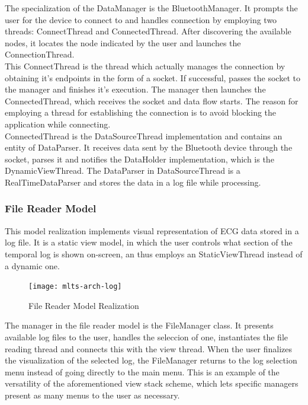 			The specialization of the DataManager is the BluetoothManager. It prompts the user for the device to connect to and handles connection by employing two threads: ConnectThread and ConnectedThread. After discovering the available nodes, it locates the node indicated by the user and launches the ConnectionThread.\\

			This ConnectThread is the thread which actually manages the connection by obtaining it's endpoints in the form of a socket. If successful, passes the socket to the manager and finishes it's execution. The manager then launches the ConnectedThread, which receives the socket and data flow starts. The reason for employing a thread for establishing the connection is to avoid blocking the application while connecting.\\

			ConnectedThread is the DataSourceThread implementation and contains an entity of DataParser. It receives data sent by the Bluetooth device through the socket, parses it and notifies the DataHolder implementation, which is the DynamicViewThread. The DataParser in DataSourceThread is a RealTimeDataParser and stores the data in a log file while processing.

		\subsubsection{File Reader Model}
			This model realization implements visual representation of ECG data stored in a log file. It is a static view model, in which the user controls what section of the temporal log is shown on-screen, an thus employs an StaticViewThread instead of a dynamic one.\\

			\begin{figure}[h]
			\centering
		    	\texttt{[image: mlts-arch-log]}
	  		\caption{File Reader Model Realization}
			\label{fig:arch-log}
			\end{figure}
		
			The manager in the file reader model is the FileManager class. It presents available log files to the user, handles the seleccion of one, instantiates the file reading thread and connects this with the view thread. When the user finalizes the visualization of the selected log, the FileManager returns to the log selection menu instead of going directly to the main menu. This is an example of the versatility of the aforementioned view stack scheme, which lets specific managers present as many menus to the user as necessary.\\

